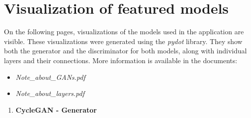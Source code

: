\documentclass{article}
\begin{document}
\section{Visualization of featured models}
On the following pages, visualizations of the models used in the application are visible. These visualizations were generated using the \textit{pydot} library. They show both the generator and the discriminator for both models, along with individual layers and their connections. More information is available in the documents:
\begin{itemize}
    \setlength\itemsep{0pt}
    \item \textit{Note\_about\_GANs.pdf}
    \item \textit{Note\_about\_layers.pdf}
\end{itemize}
\newpage
\begin{enumerate}[label=\arabic*.]
    \item \textbf{CycleGAN - Generator}
        \vspace{3mm} \\

\end{enumerate}
\end{document}
